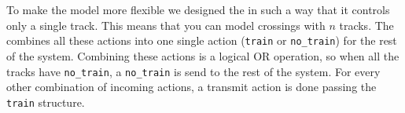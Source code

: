\documentclass[final]{report}
\begin{document}

\section{}
To make the model more flexible we designed the  in such a way that it controls only a single track.
This means that you can model crossings with $n$ tracks.
The  combines all these actions into one single action (\texttt{train} or \texttt{no\_train}) for the rest of the system.
Combining these actions is a logical OR operation, so when all the tracks have \texttt{no\_train}, a \texttt{no\_train} is send to the rest of the system.
For every other combination of incoming actions, a transmit action is done passing the \texttt{train} structure.
\end{document}
